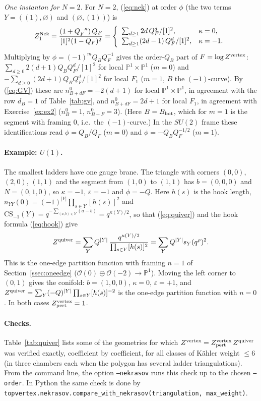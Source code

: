 \documentclass[11pt]{article}
\theoremstyle{plain}
\theoremstyle{definition}
\theoremstyle{remark}
\newcommand{\PP}{\mathbb{P}}
\newcommand{\qrho}{q^{\rho}}
\newcommand{\es}{\varnothing}
\begin{document}
\textit{One instanton for $N=2$.} For $N=2$, (\ref{eq:nek}) at order $\phi$ (the two
terms $Y=((1),\es)$ and $(\es,(1))$) is
\begin{equation}
Z^{\rm Nek}_1=\frac{(1+Q_F^{-\kappa})\,Q_F}{[1]^2(1-Q_F)^2}
=\left\{\begin{array}{ll}\sum_{d\ge1}2d\,Q_F^d/[1]^2, & \kappa=0,\\[2pt]
\sum_{d\ge1}(2d-1)\,Q_F^d/[1]^2, & \kappa=-1.\end{array}\right.
\end{equation}
Multiplying by $\phi=(-1)^mQ_{B}Q_F^{-1}$ gives the order-$Q_B$ part of $F=\log Z^{\rm vertex}$:
$\sum_{d\ge0}2(d+1)Q_BQ_F^d/[1]^2$ for local $\PP^1\times\PP^1$ ($m=0$) and
$-\sum_{d\ge0}(2d+1)Q_BQ_F^d/[1]^2$ for local $F_1$ ($m=1$, $B$ the $(-1)$-curve). By (\ref{eq:GV})
these are $n^0_{B+dF}=-2(d+1)$ for local $\PP^1\times\PP^1$, in agreement with the row $d_B=1$
of Table~\ref{tab:gv}, and $n^0_{B+dF}=2d+1$ for local $F_1$, in agreement with
Exercise~\ref{ex:ex2} ($n^0_B=1$, $n^0_{B+F}=3$). (Here $B=B_{\rm bot}$, which for $m=1$ is the
segment with framing $0$, i.e.\ the $(-1)$-curve.) In the
$SU(2)$ frame these identifications read $\phi=Q_B/Q_F$ ($m=0$) and $\phi=-Q_BQ_F^{-1/2}$ ($m=1$).

\paragraph{Example: $U(1)$.} The smallest ladders have one gauge brane. The triangle with
corners $(0,0)$, $(2,0)$, $(1,1)$ and the segment from $(1,0)$ to $(1,1)$ has $b=(0,0,0)$ and
$N=(0,1,0)$, so $\kappa=-1$, $\varepsilon=-1$ and $\phi=-Q$. Here $h(s)$ is the hook length,
$n_{YY}(0)=(-1)^{|Y|}\prod_{s\in Y}[h(s)]^2$ and
$\mathrm{CS}_{-1}(Y)=q^{-\sum_{(a,b)\in Y}(a-b)}=q^{\kappa(Y)/2}$, so that (\ref{eq:quiver})
and the hook formula (\ref{eq:hook}) give
\begin{equation}
Z^{\rm quiver}=\sum_YQ^{|Y|}\,\frac{q^{\kappa(Y)/2}}{\prod_{s\in Y}[h(s)]^2}=\sum_Y Q^{|Y|}s_Y(\qrho)^2 .
\end{equation}
This is the one-edge partition function with framing $n=1$ of Section~\ref{ssec:oneedge}
($\mathcal O(0)\oplus\mathcal O(-2)\rightarrow\PP^1$). Moving the left corner to $(0,1)$ gives the
conifold: $b=(1,0,0)$, $\kappa=0$, $\varepsilon=+1$, and
$Z^{\rm quiver}=\sum_Y(-Q)^{|Y|}\prod_{s\in Y}[h(s)]^{-2}$ is the one-edge partition function with
$n=0$. In both cases $Z^{\rm vertex}_{\rm pert}=1$.

\paragraph{Checks.} Table~\ref{tab:quiver} lists some of the geometries for which
$Z^{\rm vertex}=Z^{\rm vertex}_{\rm pert}\,Z^{\rm quiver}$ was verified exactly, coefficient by
coefficient, for all classes of K\"ahler weight $\le6$ (in three chambers each when the polygon has several ladder triangulations). From the
command line, the option \texttt{--nekrasov} runs this check up to the chosen \texttt{--order}.
In Python the same check is done by\\
\texttt{topvertex.nekrasov.compare\_with\_nekrasov(triangulation, max\_weight)}.
\end{document}
